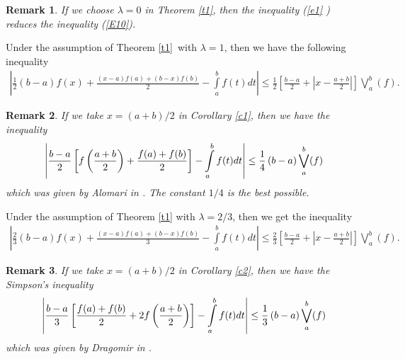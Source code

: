 \documentclass[
11pt,%
tightenlines,%
twoside,%
onecolumn,%
nofloats,%
nobibnotes,%
nofootinbib,%
superscriptaddress,%
noshowpacs,%
centertags]%
{revtex4}
\newtheorem{remark}{Remark} %
\begin{document}
\begin{remark}
If we choose $\lambda =0$ in Theorem \ref{t1}, then the inequality (\ref{e1}%
) reduces the inequality (\ref{E10}).
\end{remark}

\begin{corollary}
\label{c1} Under the assumption of Theorem \ref{t1}\ with $\lambda =1$, then
we have the following inequality%
\begin{eqnarray}\label{e4}
\left\vert \frac{1}{2}\left( b-a\right) f\left( x\right)
+\frac{\left(
x-a\right) f(a)+\left( b-x\right) f(b)}{2}-\int\limits_{a}^{b}f(t)dt\right%
\vert  \leq \frac{1}{2}\left[ \frac{b-a}{2}+\left\vert x-\frac{a+b}{2}\right\vert %
\right] \bigvee\limits_{a}^{b}(f). %
\end{eqnarray}
\end{corollary}

\begin{remark}
If we take $x=(a+b)/2$ in Corollary \ref{c1}, then we have the
inequality%
\begin{equation}
\left\vert \frac{b-a}{2}\left[ f\left( \frac{a+b}{2}\right) +\frac{f(a)+f(b)%
}{2}\right] -\int\limits_{a}^{b}f(t)dt\right\vert \leq \frac{1}{4}\left(
b-a\right) \bigvee\limits_{a}^{b}(f)  \notag
\end{equation}%
which was given by Alomari in \cite{alomari3}. The constant $1/4$ is
the best possible.
\end{remark}

\begin{corollary}
\label{c2} Under the assumption of Theorem \ref{t1} with $\lambda
=2/3$, then we get the inequality%
\begin{eqnarray}\label{e5}
\left\vert \frac{2}{3}\left( b-a\right) f\left( x\right)
+\frac{\left(
x-a\right) f(a)+\left( b-x\right) f(b)}{3}-\int\limits_{a}^{b}f(t)dt\right%
\vert \leq \frac{2}{3}\left[ \frac{b-a}{2}+\left\vert x-\frac{a+b}{2}\right\vert %
\right] \bigvee\limits_{a}^{b}(f). %
\end{eqnarray}
\end{corollary}

\begin{remark}
If we take $x=(a+b)/2$ in Corollary \ref{c2}, then we have the
Simpson's inequality%
\begin{equation}
\left\vert \frac{b-a}{3}\left[ \frac{f(a)+f(b)}{2}+2f\left( \frac{a+b}{2}%
\right) \right] -\int\limits_{a}^{b}f(t)dt\right\vert \leq \frac{1}{3}%
\left( b-a\right) \bigvee\limits_{a}^{b}(f)  \notag
\end{equation}%
which was given by Dragomir in \cite{dragomir1}.
\end{remark}
\end{document}
